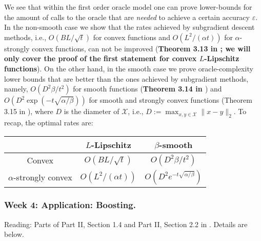 We see that within the first order oracle model one can prove lower-bounds for the amount of calls to the oracle that are \emph{needed} to achieve a certain accuracy $\varepsilon$.
In the non-smooth case we show that the rates achieved by subgradient descent methods, i.e., $O(BL/\sqrt{t})$ for convex functions and $O(L^2/(\alpha t))$ for $\alpha$-strongly convex functions, can not be improved (\textbf{Theorem 3.13 in \cite{bubeck}; we will only cover the proof of the first statement for convex $L$-Lipschitz functions}).
On the other hand, in the smooth case we prove oracle-complexity lower bounds that are better than the ones achieved by subgradient methods, namely, $O(D^2\beta/t^2)$ for smooth functions (\textbf{Theorem 3.14 in \cite{bubeck}}) and $O(D^2\exp(-t\sqrt{\alpha/\beta}))$ for smooth and strongly convex functions (Theorem 3.15 in \cite{bubeck}), where $D$ is the diameter of $\mathcal{X}$, i.e., $D:=\max_{x,y\in\mathcal{X}}\|x-y\|_2$. To recap, the optimal rates are:
\begin{center}
 \begin{tabular}{|c | c | c|}
 \hline
 & $L$-Lipschitz & $\beta$-smooth\\
 \hline
 Convex & $O(BL/\sqrt{t})$ & $O(D^2\beta/t^2)$\\
 \hline
 $\alpha$-strongly convex & $O(L^2/(\alpha t))$ & $O(D^2e^{-t\sqrt{\alpha/\beta}})$\\
 \hline
\end{tabular}
\end{center}

\subsubsection*{Week 4: Application: Boosting.}
Reading: Parts of Part II, Section 1.4 and Part II, Section 2.2 in \cite{rigollet}. Details are below.\\

